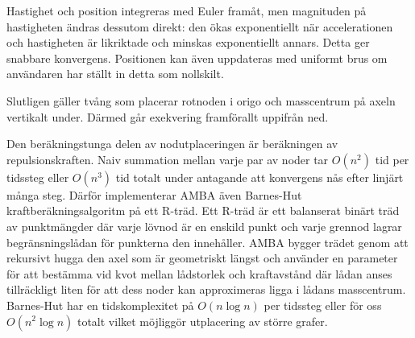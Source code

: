 Hastighet och position integreras med Euler framåt, men magnituden på
hastigheten ändras dessutom direkt: den ökas exponentiellt när accelerationen
och hastigheten är likriktade och minskas exponentiellt annars. Detta ger
snabbare konvergens. Positionen kan även uppdateras med uniformt brus om
användaren har ställt in detta som nollskilt.

Slutligen gäller tvång som placerar rotnoden i origo och masscentrum på axeln
vertikalt under. Därmed går exekvering framförallt uppifrån ned.

Den beräkningstunga delen av nodutplaceringen är beräkningen av
repulsionskraften. Naiv summation mellan varje par av noder tar $O(n^2)$ tid per
tidssteg eller $O(n^3)$ tid totalt under antagande att konvergens nås efter
linjärt många steg. Därför implementerar AMBA även Barnes-Hut
kraftberäkningsalgoritm på ett R-träd. Ett R-träd är ett balanserat binärt träd
av punktmängder där varje lövnod är en enskild punkt och varje grennod lagrar
begränsningslådan för punkterna den innehåller. AMBA bygger trädet genom att
rekursivt hugga den axel som är geometriskt längst och använder en parameter för
att bestämma vid kvot mellan lådstorlek och kraftavstånd där lådan anses
tillräckligt liten för att dess noder kan approximeras ligga i lådans
masscentrum. Barnes-Hut har en tidskomplexitet på $O(n\log n)$ per tidssteg
eller för oss $O(n^2\log n)$ totalt vilket möjliggör utplacering av större
grafer.
